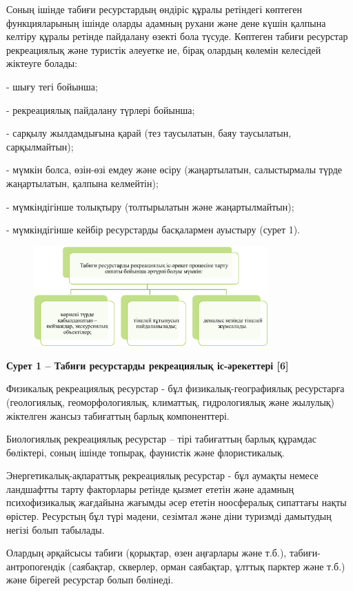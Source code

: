 Соның ішінде табиғи ресурстардың өндіріс құралы ретіндегі көптеген
функцияларының ішінде оларды адамның рухани және дене күшін қалпына
келтіру құралы ретінде пайдалану өзекті бола түсуде. Көптеген табиғи
ресурстар рекреациялық және туристік әлеуетке ие, бірақ олардың көлемін
келесідей жіктеуге болады:

- шығу тегі бойынша;

- рекреациялық пайдалану түрлері бойынша;

- сарқылу жылдамдығына қарай (тез таусылатын, баяу таусылатын,
сарқылмайтын);

- мүмкін болса, өзін-өзі емдеу және өсіру (жаңартылатын, салыстырмалы
түрде жаңартылатын, қалпына келмейтін);

- мүмкіндігінше толықтыру (толтырылатын және жаңартылмайтын);

- мүмкіндігінше кейбір ресурстарды басқалармен ауыстыру (сурет 1).

\begin{figure}[H]
	\centering
	\includegraphics[width=0.8\textwidth]{assets/1111}
	\caption*{}
\end{figure}

{\bfseries Сурет 1 -- Табиғи ресурстарды рекреациялық іс-әрекеттері
{[}6{]}}

Физикалық рекреациялық ресурстар - бұл физикалық-географиялық
ресурстарға (геологиялық, геоморфологиялық, климаттық, гидрологиялық
және жылулық) жіктелген жансыз табиғаттың барлық компоненттері.

Биологиялық рекреациялық ресурстар -- тірі табиғаттың барлық құрамдас
бөліктері, соның ішінде топырақ, фаунистік және флористикалық.

Энергетикалық-ақпараттық рекреациялық ресурстар - бұл аумақты немесе
ландшафтты тарту факторлары ретінде қызмет ететін және адамның
психофизикалық жағдайына жағымды әсер ететін ноосфералық сипаттағы нақты
өрістер. Ресурстың бұл түрі мәдени, сезімтал және діни туризмді
дамытудың негізі болып табылады.

Олардың әрқайсысы табиғи (қорықтар, өзен аңғарлары және т.б.),
табиғи-антропогендік (саябақтар, скверлер, орман саябақтар, ұлттық
парктер және т.б.) және бірегей ресурстар болып бөлінеді.

